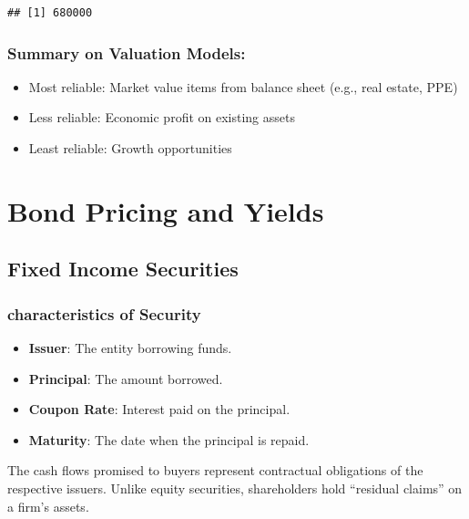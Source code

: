 \documentclass[
]{book}
\providecommand{\tightlist}{%
  \setlength{\itemsep}{0pt}\setlength{\parskip}{0pt}}
\begin{document}
\begin{verbatim}
## [1] 680000
\end{verbatim}

\hypertarget{summary-on-valuation-models}{%
\subsection{Summary on Valuation
Models:}\label{summary-on-valuation-models}}

\begin{itemize}
\tightlist
\item
  Most reliable: Market value items from balance sheet (e.g., real
  estate, PPE)
\item
  Less reliable: Economic profit on existing assets
\item
  Least reliable: Growth opportunities
\end{itemize}

\hypertarget{ch6}{%
\chapter{Bond Pricing and Yields}\label{ch6}}

\hypertarget{fixed-income-securities}{%
\section{Fixed Income Securities}\label{fixed-income-securities}}

\hypertarget{characteristics-of-security}{%
\subsection{characteristics of
Security}\label{characteristics-of-security}}

\begin{itemize}
\tightlist
\item
  \textbf{Issuer}: The entity borrowing funds.
\item
  \textbf{Principal}: The amount borrowed.
\item
  \textbf{Coupon Rate}: Interest paid on the principal.
\item
  \textbf{Maturity}: The date when the principal is repaid.
\end{itemize}

The cash flows promised to buyers represent contractual obligations of
the respective issuers. Unlike equity securities, shareholders hold
``residual claims'' on a firm's assets.
\end{document}
